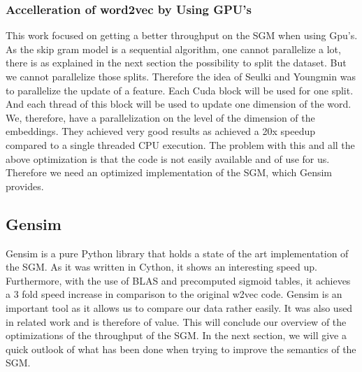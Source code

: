 \subsubsection{Accelleration of word2vec by Using GPU's}
This work \cite{gpu} focused on getting a better throughput on the SGM when using Gpu's. As the skip gram model is a sequential algorithm, one cannot parallelize a lot, there is as explained in the next section the possibility to split the dataset. But we cannot parallelize those splits. Therefore the idea of Seulki and Youngmin was to parallelize the update of a feature. Each Cuda block will be used for one split. And each thread of this block will be used to update one dimension of the word. We, therefore, have a parallelization on the level of the dimension of the embeddings. They achieved very good results as achieved a 20x speedup compared to a single threaded CPU execution. The problem with this and all the above optimization is that the code is not easily available and of use for us. Therefore we need an optimized implementation of the SGM, which Gensim \cite{gensim} provides. 
\subsection{Gensim}
Gensim \cite{gensim} is a pure Python library that holds a state of the art implementation of the SGM. As it was written in Cython, it shows an interesting speed up. Furthermore, with the use of BLAS and precomputed sigmoid tables, it achieves a 3 fold speed increase in comparison to the original w2vec code. Gensim is an important tool as it allows us to compare our data rather easily. It was also used in related work \cite{intel} and is therefore of value. This will conclude our overview of the optimizations of the throughput of the SGM. In the next section, we will give a quick outlook of what has been done when trying to improve the semantics of the SGM.



